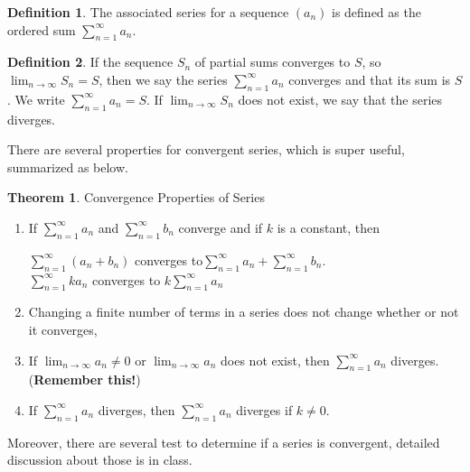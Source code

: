 \documentclass[12pt]{article}
\theoremstyle{definition}
\newtheorem{thm}{Theorem}[section]
\theoremstyle{definition}
\newtheorem{definition}{Definition}[section]
\theoremstyle{remark}
\theoremstyle{definition}
\theoremstyle{definition}
\theoremstyle{definition}
\begin{document}
\begin{definition}
The associated series for a sequence $(a_n)$ is defined as the ordered sum $\sum_{n=1}^{\infty}a_n$.
\end{definition}


\begin{definition}
If the sequence $S_n$ of partial sums converges to $S$, so $\lim_{n \to \infty}S_n = S$, then we say the series
$\sum_{n=1}^{\infty} a_n$ converges and that its sum is $S$. We write
$\sum_{n=1}^{\infty} a_n = S$. If $\lim_{n \to \infty}S_n$ does not exist, we
say that the series diverges.
\end{definition}

There are several properties for convergent series, which is super useful, summarized as below.
\begin{thm}
Convergence Properties of Series
\begin{enumerate}
\item If $\sum_{n=1}^{\infty} a_n$ and $\sum_{n=1}^{\infty} b_n$ converge and if $k$ is a constant, then

$\sum_{n=1}^{\infty} (a_n+b_n)$ converges to$\sum_{n=1}^{\infty} a_n + \sum_{n=1}^{\infty} b_n$.\\
$\sum_{n=1}^{\infty} ka_n$ converges to $k\sum_{n=1}^{\infty} a_n$

\item Changing a finite number of terms in a series does not change whether or not it converges,
\item  If $\lim_{n \to \infty}a_n\neq 0$ or $\lim_{n \to \infty}a_n$ does not exist, then
$\sum_{n=1}^{\infty} a_n$ diverges. (\textbf{Remember this!})
\item If $\sum_{n=1}^{\infty} a_n$ diverges, then $\sum_{n=1}^{\infty} a_n$ diverges if $k\neq 0$.
\end{enumerate}
\end{thm}
\pagebreak
Moreover, there are several test to determine if a series is convergent, detailed discussion about those is in class.
\end{document}

